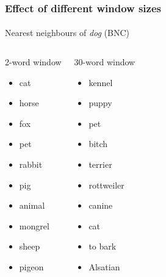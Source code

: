 \documentclass[t]{beamer} %
\begin{document}
\begin{frame}
  \frametitle{Effect of different window sizes}
  \framesubtitle{}

  \centering
  Nearest neighbours of \emph{dog} (BNC)
  \footnotesize
  \begin{columns}[t]
    \column{4cm}
    \begin{block}{2-word window}
      \begin{itemize}
      \item cat
      \item horse
      \item fox
      \item pet
      \item rabbit
      \item pig
      \item animal
      \item mongrel
      \item sheep
      \item pigeon
      \end{itemize}
    \end{block}
    \column{4cm}
    \begin{block}{30-word window}
      \begin{itemize}
      \item kennel
      \item puppy
      \item pet
      \item bitch
      \item terrier
      \item rottweiler
      \item canine
      \item cat
      \item to bark
      \item Alsatian
      \end{itemize}
    \end{block}
  \end{columns}
\end{frame}
\end{document}
